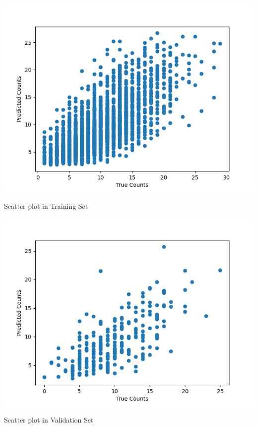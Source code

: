 \begin{answer}

\includegraphics[width=1\textwidth]{poisson/poisson_plot_train.png}

Scatter plot in Training Set

\includegraphics[width=1\textwidth]{poisson/poisson_plot_eval.png}

Scatter plot in Validation Set

\end{answer}
